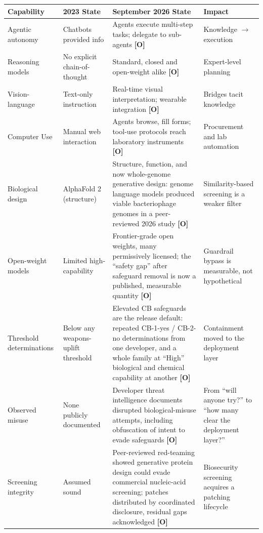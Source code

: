 \documentclass[11pt,letterpaper]{article}
\begin{document}
\begin{center}
\small
\begin{tabular}{L{2.6cm}L{3.4cm}L{5.2cm}L{2.4cm}}
\toprule
\textbf{Capability} & \textbf{2023 State} & \textbf{September 2026 State} & \textbf{Impact} \\
\midrule
Agentic autonomy & Chatbots provided info & Agents execute multi-step tasks; delegate to sub-agents \textbf{[O]} & Knowledge $\to$ execution \\
Reasoning models & No explicit chain-of-thought & Standard, closed and open-weight alike \textbf{[O]} & Expert-level planning \\
Vision-language & Text-only instruction & Real-time visual interpretation; wearable integration \textbf{[O]} & Bridges tacit knowledge \\
Computer Use & Manual web interaction & Agents browse, fill forms; tool-use protocols reach laboratory instruments \textbf{[O]} & Procurement and lab automation \\
Biological design & AlphaFold 2 (structure) & Structure, function, and now whole-genome generative design: genome language models produced viable bacteriophage genomes in a peer-reviewed 2026 study \textbf{[O]} & Similarity-based screening is a weaker filter \\
Open-weight models & Limited high-capability & Frontier-grade open weights, many permissively licensed; the ``safety gap'' after safeguard removal is now a published, measurable quantity \textbf{[O]} & Guardrail bypass is measurable, not hypothetical \\
Threshold determinations & Below any weapons-uplift threshold & Elevated CB safeguards are the release default: repeated CB-1-yes / CB-2-no determinations from one developer, and a whole family at ``High'' biological and chemical capability at another \textbf{[O]} & Containment moved to the deployment layer \\
Observed misuse & None publicly documented & Developer threat intelligence documents disrupted biological-misuse attempts, including obfuscation of intent to evade safeguards \textbf{[O]} & From ``will anyone try?'' to ``how many clear the deployment layer?'' \\
Screening integrity & Assumed sound & Peer-reviewed red-teaming showed generative protein design could evade commercial nucleic-acid screening; patches distributed by coordinated disclosure, residual gaps acknowledged \textbf{[O]} & Biosecurity screening acquires a patching lifecycle \\
\bottomrule
\end{tabular}
\end{center}
\end{document}
